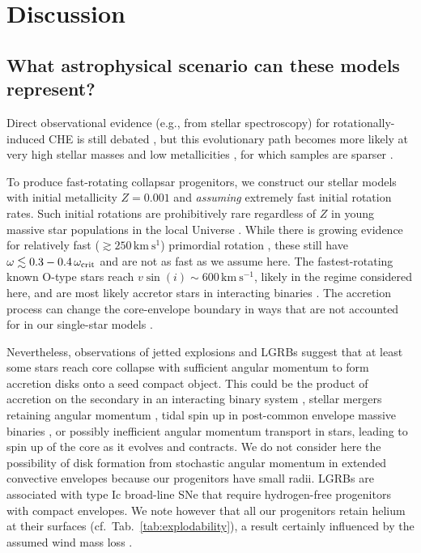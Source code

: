 \documentclass[%
trackchanges,twocolumn]{aastex701}
\DeclareRobustCommand{\Tabref}[1]{Tab.~\ref{#1}}
\begin{document}
\section{Discussion}
\label{sec:discussion}

\subsection{What astrophysical scenario can these models represent?}
\label{sec:scenario}

Direct observational evidence (e.g., from stellar spectroscopy) for
rotationally-induced CHE is still debated \cite[e.g.,][]{hunter:08,
  martins:09, martins:13,almeida:15, mahy:20, sharpe:24}, but this
evolutionary path becomes more likely at very high stellar masses and
low metallicities \citep[e.g.,][]{yoon:06}, for which samples are
sparser \cite[e.g.,][]{evans:11, shenar:24}.

To produce fast-rotating collapsar progenitors, we construct our
stellar models with initial metallicity $Z=0.001$ and \emph{assuming}
extremely fast initial rotation rates. Such initial rotations are
prohibitively rare regardless of $Z$ in young massive star populations
in the local Universe \citep[e.g.,][]{hunter:08, ramirez-agudelo:13,
  ramirez-agudelo:15, dufton:19, galan-dieguez:26, lennon:26}. While
there is growing evidence for relatively fast
($\gtrsim 250\,\mathrm{km\ s^{1}}$) primordial rotation
\citep[e.g.,][]{naze:23, britavskiy:24, naze:25}, these still have
$\omega\lesssim 0.3-0.4\,\omega_{\rm crit}$ and are not as fast as we
assume here. The fastest-rotating known O-type stars reach
$v\sin(i)\sim600\,\mathrm{km\ s^{-1}}$, likely in the regime
considered here, and are most likely accretor stars in interacting
binaries \citep{cantiello:07, ramirez-agudelo:15, renzo:21}. The
accretion process can change the core-envelope boundary in ways that
are not accounted for in our single-star models
\citep[e.g.,][]{cantiello:07, renzo:21, renzo:23, wagg:24, landri:25,
  nathaniel:25, shah:26, henneco:26}.

Nevertheless, observations of jetted explosions and LGRBs suggest that
at least some stars reach core collapse with sufficient angular
momentum to form accretion disks onto a seed compact object. This
could be the product of accretion on the secondary in an interacting
binary system \citep[e.g.,][]{cantiello:07}, stellar mergers retaining
angular momentum \citep[e.g.,][]{chatzopoulos:20,renzo:20c}, tidal
spin up in post-common envelope massive binaries
\citep{bavera:20,bavera:22,sen:25}, or possibly inefficient angular
momentum transport in stars, leading to spin up of the core as it
evolves and contracts. We do not consider here the possibility of disk
formation from stochastic angular momentum in extended convective
envelopes \citep[e.g.,][]{quataert:19, shishkin:21,antoni:25} because
our progenitors have small radii. LGRBs are associated with type Ic
broad-line SNe that require hydrogen-free progenitors with compact
envelopes. We note however that all our progenitors retain helium at
their surfaces (cf.~\Tabref{tab:explodability}), a result certainly
influenced by the assumed wind mass loss \citep[e.g.,][]{renzo:17}.
\end{document}
